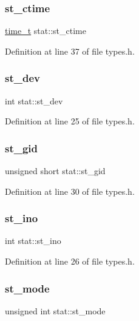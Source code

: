 \subsubsection{\texorpdfstring{st\_ctime}{st\_ctime}}
{\footnotesize\ttfamily \mbox{\hyperlink{time_8h_aec517130c026730881898750d76e596f}{time\+\_\+t}} stat\+::st\+\_\+ctime}



Definition at line 37 of file types.\+h.

\mbox{\label{structstat_a80bdfc2e3289b57eb9939aaa5fa1f570}} 
\subsubsection{\texorpdfstring{st\_dev}{st\_dev}}
{\footnotesize\ttfamily int stat\+::st\+\_\+dev}



Definition at line 25 of file types.\+h.

\mbox{\label{structstat_a0a816257595eebd717ab8b9f7cb6e8d8}} 
\subsubsection{\texorpdfstring{st\_gid}{st\_gid}}
{\footnotesize\ttfamily unsigned short stat\+::st\+\_\+gid}



Definition at line 30 of file types.\+h.

\mbox{\label{structstat_a12ab118770f050cd0c6eeb53f0a3bc04}} 
\subsubsection{\texorpdfstring{st\_ino}{st\_ino}}
{\footnotesize\ttfamily int stat\+::st\+\_\+ino}



Definition at line 26 of file types.\+h.

\mbox{\label{structstat_a00cd6f23b3cbc64221f90e7b019bc064}} 
\subsubsection{\texorpdfstring{st\_mode}{st\_mode}}
{\footnotesize\ttfamily unsigned int stat\+::st\+\_\+mode}



